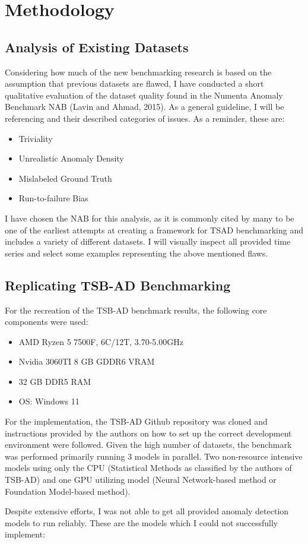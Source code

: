 \documentclass[12pt,oneside]{article}
\begin{document}
\section{Methodology}

\subsection{Analysis of Existing Datasets}

Considering how much of the new benchmarking research is based on the assumption that previous datasets are flawed, I have conducted a short qualitative evaluation of the dataset quality found in the Numenta Anomaly Benchmark NAB (Lavin and Ahmad, 2015). As a general guideline, I will be referencing \cite{wu2021current} and their described categories of issues. As a reminder, these are:

\begin{itemize}
    \item Triviality
    \item Unrealistic Anomaly Density
    \item Mislabeled Ground Truth
    \item Run-to-failure Bias
\end{itemize}

I have chosen the NAB for this analysis, as it is commonly cited by many to be one of the earliest attempts at creating a framework for TSAD benchmarking and includes a variety of different datasets. I will visually inspect all provided time series and select some examples representing the above mentioned flaws.

\subsection{Replicating TSB-AD Benchmarking}

For the recreation of the TSB-AD benchmark results, the following core components were used:
\begin{itemize}
    \item AMD Ryzen 5 7500F, 6C/12T, 3.70-5.00GHz
    \item Nvidia 3060TI 8 GB GDDR6 VRAM
    \item 32 GB DDR5 RAM
    \item OS: Windows 11
\end{itemize}

For the implementation, the TSB-AD Github repository was cloned and instructions provided by the authors on how to set up the correct development environment were followed. Given the high number of datasets, the benchmark was performed primarily running 3 models in parallel. Two non-resource intensive models using only the CPU (Statistical Methods as classified by the authors of TSB-AD) and one GPU utilizing model (Neural Network-based method or Foundation Model-based method).\par
Despite extensive efforts, I was not able to get all provided anomaly detection models to run reliably. These are the models which I could not successfully implement:
\end{document}
